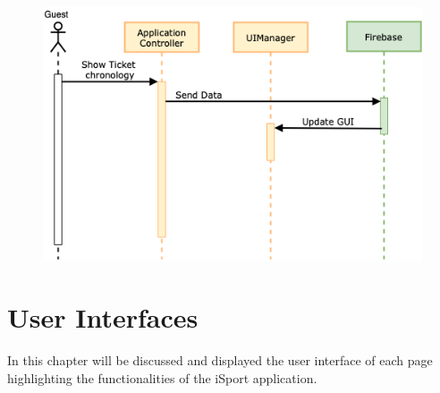 \documentclass[numbers=noenddot, 12pt, a4paper, oneside]{scrbook}
\begin{document}
\begin{figure}[H]
	\centering
	\includegraphics[width=1\textwidth]{images/Sequence/TicketChronology}
\end{figure}


\chapter{User Interfaces}
In this chapter will be discussed and displayed the user interface of each page highlighting the functionalities of the iSport application.
\end{document}
